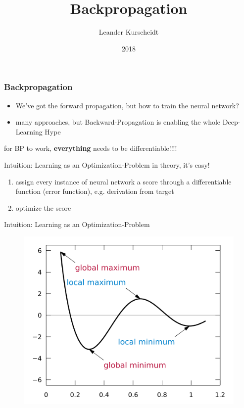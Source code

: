 \documentclass{beamer}
\title{Backpropagation}
\author{Leander Kurscheidt}
\institute{Hack \& S{\"o}hne}
\date{2018}
\begin{document}
 
\frame{\titlepage}
 
\begin{frame}
\frametitle{Backpropagation}
\begin{itemize}
    \item We've got the forward propagation, but how to train the neural network?
    \item many approaches, but Backward-Propagation is enabling the whole Deep-Learning Hype
\end{itemize}
for BP to work, \textbf{everything} needs to be differentiable!!!!
\end{frame}

\begin{frame}{Intuition: Learning as an Optimization-Problem}
in theory, it's easy!
\vfill
\begin{enumerate}
    \item assign every instance of neural network a score through a differentiable function (error function), e.g. derivation from target
    \item optimize the score
\end{enumerate}
\end{frame}

\begin{frame}{Intuition: Learning as an Optimization-Problem}
\begin{figure}
\includegraphics[scale=0.5]{../assets/512px-Extrema_example_original.png}
\caption{\cite{extremaMinima}}
\end{figure}
\end{frame}
\end{document}
